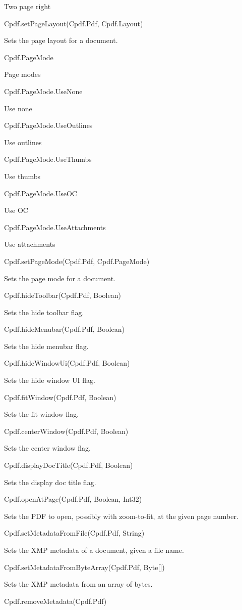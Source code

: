 Two page right

Cpdf.setPageLayout(Cpdf.Pdf, Cpdf.Layout)


Sets the page layout for a document.


Cpdf.PageMode

Page modes

Cpdf.PageMode.UseNone

Use none

Cpdf.PageMode.UseOutlines

Use outlines

Cpdf.PageMode.UseThumbs

Use thumbs

Cpdf.PageMode.UseOC

Use OC

Cpdf.PageMode.UseAttachments

Use attachments

Cpdf.setPageMode(Cpdf.Pdf, Cpdf.PageMode)


Sets the page mode for a document.


Cpdf.hideToolbar(Cpdf.Pdf, Boolean)


Sets the hide toolbar flag.


Cpdf.hideMenubar(Cpdf.Pdf, Boolean)


Sets the hide menubar flag.


Cpdf.hideWindowUi(Cpdf.Pdf, Boolean)


Sets the hide window UI flag.


Cpdf.fitWindow(Cpdf.Pdf, Boolean)


Sets the fit window flag.


Cpdf.centerWindow(Cpdf.Pdf, Boolean)


Sets the center window flag.


Cpdf.displayDocTitle(Cpdf.Pdf, Boolean)


Sets the display doc title flag.


Cpdf.openAtPage(Cpdf.Pdf, Boolean, Int32)


Sets the PDF to open, possibly with
zoom-to-fit, at the given page number.


Cpdf.setMetadataFromFile(Cpdf.Pdf, String)


Sets the XMP metadata of a
document, given a file name.


Cpdf.setMetadataFromByteArray(Cpdf.Pdf, Byte[])


Sets the XMP metadata from
an array of bytes.


Cpdf.removeMetadata(Cpdf.Pdf)


